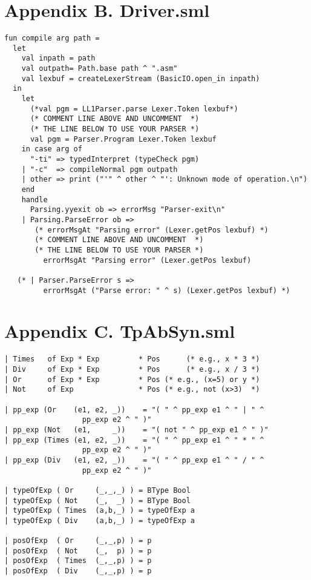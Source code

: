 \documentclass[12pt,a4paper,english]{article}
\begin{document}
\newpage
\section{Appendix B. Driver.sml}

\begin{lstlisting}[caption=The Driver.sml changes for our parser.grm.]
fun compile arg path =
  let
    val inpath = path
    val outpath= Path.base path ^ ".asm"
    val lexbuf = createLexerStream (BasicIO.open_in inpath)
  in
    let
      (*val pgm = LL1Parser.parse Lexer.Token lexbuf*)
      (* COMMENT LINE ABOVE AND UNCOMMENT  *)
      (* THE LINE BELOW TO USE YOUR PARSER *)
      val pgm = Parser.Program Lexer.Token lexbuf
    in case arg of
      "-ti" => typedInterpret (typeCheck pgm)
    | "-c"  => compileNormal pgm outpath
    | other => print ("'" ^ other ^ "': Unknown mode of operation.\n")
    end
    handle
      Parsing.yyexit ob => errorMsg "Parser-exit\n"
    | Parsing.ParseError ob =>
       (* errorMsgAt "Parsing error" (Lexer.getPos lexbuf) *)
       (* COMMENT LINE ABOVE AND UNCOMMENT  *)
       (* THE LINE BELOW TO USE YOUR PARSER *)
         errorMsgAt "Parsing error" (Lexer.getPos lexbuf)

   (* | Parser.ParseError s =>
         errorMsgAt ("Parse error: " ^ s) (Lexer.getPos lexbuf) *)
\end{lstlisting}

\newpage
\section{Appendix C. TpAbSyn.sml}

\begin{lstlisting}[caption=TpAbSyn.sml with the functionality of the four operations implemented for task 2.]
| Times   of Exp * Exp         * Pos      (* e.g., x * 3 *)
| Div     of Exp * Exp         * Pos      (* e.g., x / 3 *) 
| Or      of Exp * Exp         * Pos (* e.g., (x=5) or y *)
| Not     of Exp               * Pos (* e.g., not (x>3)  *)

| pp_exp (Or    (e1, e2, _))    = "( " ^ pp_exp e1 ^ " | " ^ 
				  pp_exp e2 ^ " )"
| pp_exp (Not   (e1,     _))    = "( not " ^ pp_exp e1 ^ " )"
| pp_exp (Times (e1, e2, _))    = "( " ^ pp_exp e1 ^ " * " ^ 
				  pp_exp e2 ^ " )"
| pp_exp (Div   (e1, e2, _))    = "( " ^ pp_exp e1 ^ " / " ^
				  pp_exp e2 ^ " )"

| typeOfExp ( Or     (_,_,_) ) = BType Bool
| typeOfExp ( Not    (_,  _) ) = BType Bool
| typeOfExp ( Times  (a,b,_) ) = typeOfExp a
| typeOfExp ( Div    (a,b,_) ) = typeOfExp a

| posOfExp  ( Or     (_,_,p) ) = p
| posOfExp  ( Not    (_,  p) ) = p
| posOfExp  ( Times  (_,_,p) ) = p
| posOfExp  ( Div    (_,_,p) ) = p
\end{lstlisting}
\end{document}
